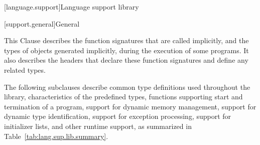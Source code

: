 [language.support]{Language support library}

[support.general]{General}

\pnum
This Clause describes the function signatures that are called
implicitly, and the types of objects generated implicitly, during the execution
of some \Cpp programs.
It also describes the headers that declare these function
signatures and define any related types.

\pnum
The following subclauses describe
common type definitions used throughout the library,
characteristics of the predefined types,
functions supporting start and termination of a \Cpp program,
support for dynamic memory management,
support for dynamic type identification,
support for exception processing, support for initializer lists,
and other runtime support,
as summarized in Table~\ref{tab:lang.sup.lib.summary}.

